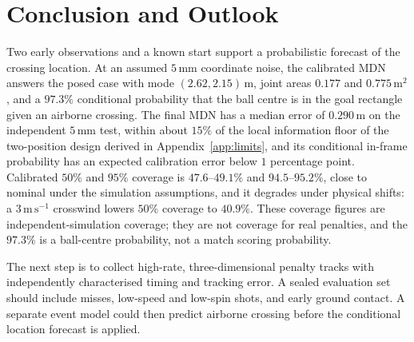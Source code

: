 \documentclass[11pt,a4paper]{article}
\begin{document}
\section{Conclusion and Outlook}

Two early observations and a known start support a probabilistic forecast of the crossing location. At an assumed $5\,\mathrm{mm}$ coordinate noise, the calibrated MDN answers the posed case with mode $(2.62,2.15)\,\mathrm{m}$, joint areas $0.177$ and $0.775\,\mathrm{m^2}$, and a $97.3\%$ conditional probability that the ball centre is in the goal rectangle given an airborne crossing. The final MDN has a median error of $0.290\,\mathrm{m}$ on the independent $5\,\mathrm{mm}$ test, within about $15\%$ of the local information floor of the two-position design derived in Appendix~\ref{app:limits}, and its conditional in-frame probability has an expected calibration error below $1$ percentage point. Calibrated $50\%$ and $95\%$ coverage is $47.6$--$49.1\%$ and $94.5$--$95.2\%$, close to nominal under the simulation assumptions, and it degrades under physical shifts: a $3\,\mathrm{m\,s^{-1}}$ crosswind lowers $50\%$ coverage to $40.9\%$. These coverage figures are independent-simulation coverage; they are not coverage for real penalties, and the $97.3\%$ is a ball-centre probability, not a match scoring probability.

The next step is to collect high-rate, three-dimensional penalty tracks with independently characterised timing and tracking error. A sealed evaluation set should include misses, low-speed and low-spin shots, and early ground contact. A separate event model could then predict airborne crossing before the conditional location forecast is applied.
\end{document}
